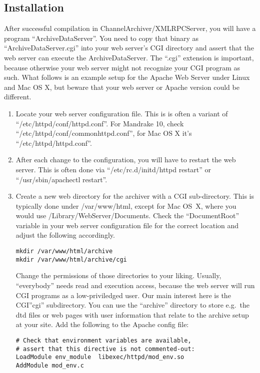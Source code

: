 \subsection{Installation} %
After successful compilation in ChannelArchiver/XMLRPCServer, you will
have a program ``ArchiveDataServer''. You need to copy that binary as
``ArchiveDataServer.cgi'' into your web server's CGI directory and
assert that the web server can execute the ArchiveDataServer.
The ``.cgi'' extension is important, because otherwise your web server
might not recognize your CGI program as such.
What follows is an example setup for the Apache Web Server under Linux
and Mac OS X, but beware that your web server or Apache version
could be different.
\begin{enumerate}
\item Locate your web server configuration file. This is is often 
  a variant of ``/etc/httpd/conf/httpd.conf''. For Mandrake 10, check
  ``/etc/httpd/conf/commonhttpd.conf'',
  for Mac OS X it's ``/etc/httpd/httpd.conf''.
\item After each change to the configuration, you will have to restart the
 web server. This is often done via 
``/etc/rc.d/initd/httpd restart''
or
``/usr/sbin/apachectl restart''.
\item Create a new web directory for the archiver with a CGI
   sub-directory. This is typically done under /var/www/html,
   except for Mac OS~X, where you would use /Library/WebServer/Documents.
   Check the ``DocumentRoot'' variable in your web server configuration file
   for the correct location and adjust the following accordingly.
\begin{lstlisting}[keywordstyle=\sffamily]
mkdir /var/www/html/archive
mkdir /var/www/html/archive/cgi
\end{lstlisting}
   Change the permissions of those directories to your liking.
   Usually, ``everybody'' needs read and execution access, because
   the web server will run CGI programs as a low-priviledged user. 
   Our main interest here is the CGI''cgi'' subdirectory.
   You can use the ``archive'' directory to store e.g.\ the dtd files
   or web pages with user information that relate to the archive setup
   at your site.
   Add the following to the Apache config file:
\begin{lstlisting}[keywordstyle=\sffamily]
# Check that environment variables are available,
# assert that this directive is not commented-out:
LoadModule env_module  libexec/httpd/mod_env.so
AddModule mod_env.c


\end{lstlisting}
\end{enumerate}
